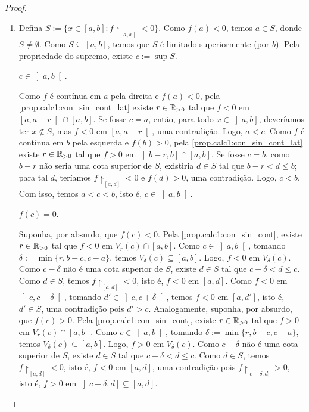 \begin{proof} 
    \begin{enumerate}[leftmargin=*, align=left, label=\textbf{(\alph*)}]
        \item Defina $S := \{x \in [a,b] : f \restriction_{[a,x]} < 0\}$. Como $f(a) < 0$, temos $a \in S$, donde $S \neq \emptyset$. Como $S \subseteq [a,b]$, temos que $S$ é limitado superiormente (por $b$). Pela propriedade do supremo, existe $c := \sup S$.
            \begin{claim}
                $c \in \left]a,b \right[$.
            \end{claim}
            \begin{midproof}
                Como $f$ é contínua em $a$ pela direita e $f(a) < 0$, pela \cref{prop.calc1:con_sin_cont_lat} existe $r \in \mathbb{R}_{>0}$ tal que $f < 0$ em $\left[a, a+r \right[ \cap [a,b]$. Se fosse $c=a$, então, para todo $x \in \left]a,b \right]$, deveríamos ter $x \notin S$, mas $f < 0$ em $\left[a,a+r\right[$, uma contradição. Logo, $a < c$. Como $f$ é contínua em $b$ pela esquerda e $f(b) > 0$, pela \cref{prop.calc1:con_sin_cont_lat} existe $r \in \mathbb{R}_{>0}$ tal que $f > 0$ em $\left]b-r, b \right] \cap [a,b]$. Se fosse $c=b$, como $b-r$ não seria uma cota superior de $S$, existiria $d \in S$ tal que $b-r < d \leq b$; para tal $d$, teríamos $f \restriction_{[a,d]} < 0$ e $f(d) > 0$, uma contradição. Logo, $c < b$. Com isso, temos $a<c<b$, isto é, $c \in \left] a,b \right[$. \whiteproof
            \end{midproof}
            \begin{claim}
                $f(c) = 0$.
            \end{claim}
            \begin{midproof}
                Suponha, por absurdo, que $f(c) < 0$. Pela \cref{prop.calc1:con_sin_cont}, existe $r \in \mathbb{R}_{>0}$ tal que $f < 0$ em $V_{r}(c) \cap [a,b]$. Como $c \in \left]a,b \right[$, tomando $\delta := \min \{r, b-c, c-a\}$, temos $V_{\delta}(c) \subseteq [a,b]$. Logo, $f<0$ em $V_{\delta}(c)$. Como $c-\delta$ não é uma cota superior de $S$, existe $d \in S$ tal que $c-\delta< d \leq c$. Como $d \in S$, temos $f \restriction_{[a,d]} < 0$, isto é, $f < 0$ em $[a,d]$. Como $f < 0$ em $\left]c, c+\delta \right[$, tomando $d' \in \left]c, c+\delta \right[$, temos $f<0$ em $\left[a, d' \right]$, isto é, $d' \in S$, uma contradição pois $d' > c$. Analogamente, suponha, por absurdo, que $f(c) > 0$. Pela \cref{prop.calc1:con_sin_cont}, existe $r \in \mathbb{R}_{>0}$ tal que $f > 0$ em $V_{r}(c) \cap [a,b]$. Como $c \in \left]a,b \right[$, tomando $\delta := \min \{r, b-c, c-a\}$, temos $V_{\delta}(c) \subseteq [a,b]$. Logo, $f>0$ em $V_{\delta}(c)$. Como $c-\delta$ não é uma cota superior de $S$, existe $d \in S$ tal que $c-\delta< d \leq c$. Como $d \in S$, temos $f \restriction_{[a,d]} < 0$, isto é, $f < 0$ em $[a,d]$, uma contradição pois $f \restriction_{]c-\delta, d]} > 0$, isto é, $f > 0$ em $\left]c-\delta, d \right] \subseteq [a,d]$. \whiteproof

\end{midproof}
\end{enumerate}
\end{proof}
